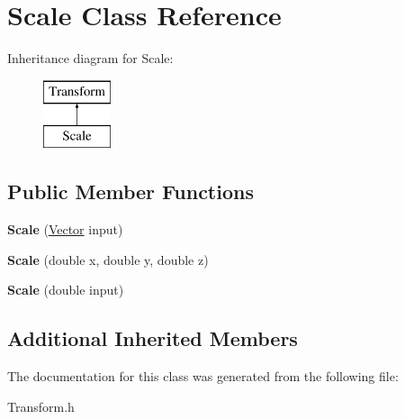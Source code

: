 \hypertarget{class_scale}{}\section{Scale Class Reference}
\label{class_scale}
Inheritance diagram for Scale\+:\begin{figure}[H]
\begin{center}
\leavevmode
\includegraphics[height=2.000000cm]{class_scale}
\end{center}
\end{figure}
\subsection*{Public Member Functions}
\begin{DoxyCompactItemize}
\item 
\hypertarget{class_scale_a764037517d6d322c62ecaa239e8118f3}{}\label{class_scale_a764037517d6d322c62ecaa239e8118f3} 
{\bfseries Scale} (\hyperlink{class_vector}{Vector} input)
\item 
\hypertarget{class_scale_ab6dce279bf01982adf281ca67bd4ca93}{}\label{class_scale_ab6dce279bf01982adf281ca67bd4ca93} 
{\bfseries Scale} (double x, double y, double z)
\item 
\hypertarget{class_scale_aec810bcc0db8deb0a1ab4b62004c63d3}{}\label{class_scale_aec810bcc0db8deb0a1ab4b62004c63d3} 
{\bfseries Scale} (double input)
\end{DoxyCompactItemize}
\subsection*{Additional Inherited Members}


The documentation for this class was generated from the following file\+:\begin{DoxyCompactItemize}
\item 
Transform.\+h\end{DoxyCompactItemize}
